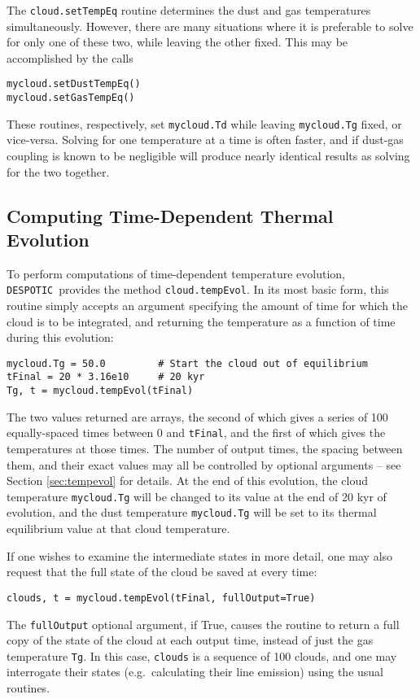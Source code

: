 \documentclass[12pt]{article}
\newcommand{\despotic}{\texttt{DESPOTIC}}
\begin{document}
The \verb=cloud.setTempEq= routine determines the dust and gas temperatures simultaneously. However, there are many situations where it is preferable to solve for only one of these two, while leaving the other fixed. This may be accomplished by the calls
\begin{verbatim}
mycloud.setDustTempEq()
mycloud.setGasTempEq()
\end{verbatim}
These routines, respectively, set \verb=mycloud.Td= while leaving \verb=mycloud.Tg= fixed, or vice-versa. Solving for one temperature at a time is often faster, and if dust-gas coupling is known to be negligible will produce nearly identical results as solving for the two together.


\subsection{Computing Time-Dependent Thermal Evolution}

To perform computations of time-dependent temperature evolution, \despotic\ provides the method \verb=cloud.tempEvol=. In its most basic form, this routine simply accepts an argument specifying the amount of time for which the cloud is to be integrated, and returning the temperature as a function of time during this evolution:
\begin{verbatim}
mycloud.Tg = 50.0         # Start the cloud out of equilibrium
tFinal = 20 * 3.16e10     # 20 kyr
Tg, t = mycloud.tempEvol(tFinal)
\end{verbatim}
The two values returned are arrays, the second of which gives a series of 100 equally-spaced times between 0 and \verb=tFinal=, and the first of which gives the temperatures at those times. The number of output times, the spacing between them, and their exact values may all be controlled by optional arguments -- see Section \ref{sec:tempevol} for details. At the end of this evolution, the cloud temperature \verb=mycloud.Tg= will be changed to its value at the end of 20 kyr of evolution, and the dust temperature \verb=mycloud.Tg= will be set to its thermal equilibrium value at that cloud temperature.

If one wishes to examine the intermediate states in more detail, one may also request that the full state of the cloud be saved at every time:
\begin{verbatim}
clouds, t = mycloud.tempEvol(tFinal, fullOutput=True)
\end{verbatim}
The \verb=fullOutput= optional argument, if True, causes the routine to return a full copy of the state of the cloud at each output time, instead of just the gas temperature \verb=Tg=. In this case, \verb=clouds= is a sequence of 100 clouds, and one may interrogate their states (e.g.~calculating their line emission) using the usual routines.
\end{document}
